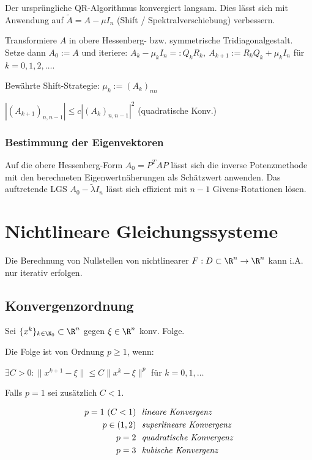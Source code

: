 Der ursprüngliche QR-Algorithmus konvergiert langsam. Dies lässt sich mit Anwendung auf $\tilde A = A - \mu I_n$ (Shift / Spektralverschiebung) verbessern.

\spacing

Transformiere $A$ in obere Hessenberg- bzw. symmetrische Tridiagonalgestalt. Setze dann $A_0 := A$ und iteriere: $A_k - \mu_k I_n =: Q_kR_k, \ A_{k+1} := R_kQ_k + \mu_k I_n$ für $k = 0,1,2,\dots$.

\spacing

Bewährte Shift-Strategie: $\mu_k := (A_k)_{nn}$

$|(A_{k+1})_{n,n-1}| \leq c |(A_k)_{n,n-1}|^2$ (quadratische Konv.)

\subsubsection*{Bestimmung der Eigenvektoren}

Auf die obere Hessenberg-Form $A_0 = P^T A P$ lässt sich die inverse Potenzmethode mit den berechneten Eigenwertnäherungen als Schätzwert anwenden. Das auftretende LGS $A_0 - \tilde\lambda I_n$ lässt sich effizient mit $n-1$ Givens-Rotationen lösen.

\section*{Nichtlineare Gleichungssysteme}

Die Berechnung von Nullstellen von nichtlinearer $F : D \subset \R^n \to \R^n$ kann i.A. nur iterativ erfolgen.

\subsection*{Konvergenzordnung}

Sei $\{x^k\}_{k\in\N_0} \subset \R^n$ gegen $\xi \in \R^n$ konv. Folge.

Die Folge ist von Ordnung $p \geq 1$, wenn:

$\exists C > 0 : \| x^{k+1}-\xi \| \leq C\|x^k-\xi\|^p$ für $k = 0,1,\dots$

Falls $p=1$ sei zusätzlich $C < 1$.

\vspace*{-4mm}
\begin{align*}
	p=1 \ (C<1) & \text{\ \ \emph{lineare Konvergenz}} \\
	p\in(1,2)       & \text{\ \ \emph{superlineare Konvergenz}} \\
	p=2         & \text{\ \ \emph{quadratische Konvergenz}} \\
	p=3         & \text{\ \ \emph{kubische Konvergenz}}
\end{align*}

